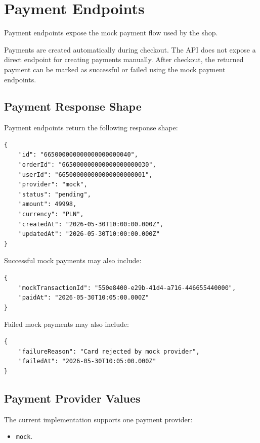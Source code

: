 \section{Payment Endpoints}

Payment endpoints expose the mock payment flow used by the shop.

Payments are created automatically during checkout. The API does not expose a direct endpoint for creating payments manually. After checkout, the returned payment can be marked as successful or failed using the mock payment endpoints.

\subsection{Payment Response Shape}

Payment endpoints return the following response shape:

\begin{verbatim}
{
    "id": "665000000000000000000040",
    "orderId": "665000000000000000000030",
    "userId": "665000000000000000000001",
    "provider": "mock",
    "status": "pending",
    "amount": 49998,
    "currency": "PLN",
    "createdAt": "2026-05-30T10:00:00.000Z",
    "updatedAt": "2026-05-30T10:00:00.000Z"
}
\end{verbatim}

Successful mock payments may also include:

\begin{verbatim}
{
    "mockTransactionId": "550e8400-e29b-41d4-a716-446655440000",
    "paidAt": "2026-05-30T10:05:00.000Z"
}
\end{verbatim}

Failed mock payments may also include:

\begin{verbatim}
{
    "failureReason": "Card rejected by mock provider",
    "failedAt": "2026-05-30T10:05:00.000Z"
}
\end{verbatim}

\subsection{Payment Provider Values}

The current implementation supports one payment provider:

\begin{itemize}
    \item \texttt{mock}.
\end{itemize}

